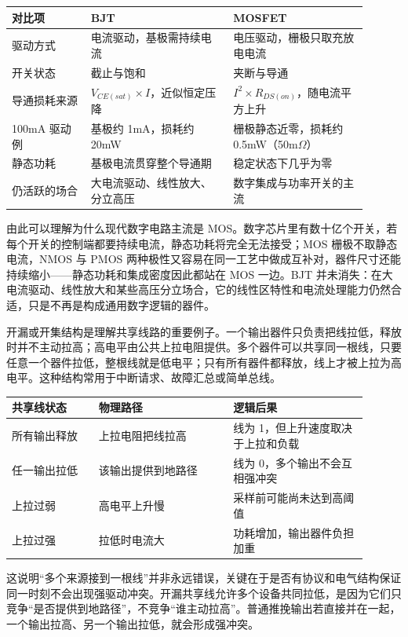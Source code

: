\begin{longtable}{L{0.2\linewidth}L{0.36\linewidth}L{0.34\linewidth}}
\toprule
对比项 & BJT & MOSFET \\
\midrule
驱动方式 & 电流驱动，基极需持续电流 & 电压驱动，栅极只取充放电电流 \\
开关状态 & 截止与饱和 & 夹断与导通 \\
导通损耗来源 & $V_{CE(sat)} \times I$，近似恒定压降 & $I^2 \times R_{DS(on)}$，随电流平方上升 \\
100mA 驱动例 & 基极约 1mA，损耗约 20mW & 栅极静态近零，损耗约 0.5mW（50m$\Omega$） \\
静态功耗 & 基极电流贯穿整个导通期 & 稳定状态下几乎为零 \\
仍活跃的场合 & 大电流驱动、线性放大、分立高压 & 数字集成与功率开关的主流 \\
\bottomrule
\end{longtable}

由此可以理解为什么现代数字电路主流是 MOS。数字芯片里有数十亿个开关，若每个开关的控制端都要持续电流，静态功耗将完全无法接受；MOS 栅极不取静态电流，NMOS 与 PMOS 两种极性又容易在同一工艺中做成互补对，器件尺寸还能持续缩小——静态功耗和集成密度因此都站在 MOS 一边。BJT 并未消失：在大电流驱动、线性放大和某些高压分立场合，它的线性区特性和电流处理能力仍然合适，只是不再是构成通用数字逻辑的器件。

开漏或开集结构是理解共享线路的重要例子。一个输出器件只负责把线拉低，释放时并不主动拉高；高电平由公共上拉电阻提供。多个器件可以共享同一根线，只要任意一个器件拉低，整根线就是低电平；只有所有器件都释放，线上才被上拉为高电平。这种结构常用于中断请求、故障汇总或简单总线。

\begin{longtable}{L{0.22\linewidth}L{0.34\linewidth}L{0.34\linewidth}}
\toprule
共享线状态 & 物理路径 & 逻辑后果 \\
\midrule
所有输出释放 & 上拉电阻把线拉高 & 线为 1，但上升速度取决于上拉和负载 \\
任一输出拉低 & 该输出提供到地路径 & 线为 0，多个输出不会互相强冲突 \\
上拉过弱 & 高电平上升慢 & 采样前可能尚未达到高阈值 \\
上拉过强 & 拉低时电流大 & 功耗增加，输出器件负担加重 \\
\bottomrule
\end{longtable}

这说明“多个来源接到一根线”并非永远错误，关键在于是否有协议和电气结构保证同一时刻不会出现强驱动冲突。开漏共享线允许多个设备共同拉低，是因为它们只竞争“是否提供到地路径”，不竞争“谁主动拉高”。普通推挽输出若直接并在一起，一个输出拉高、另一个输出拉低，就会形成强冲突。

